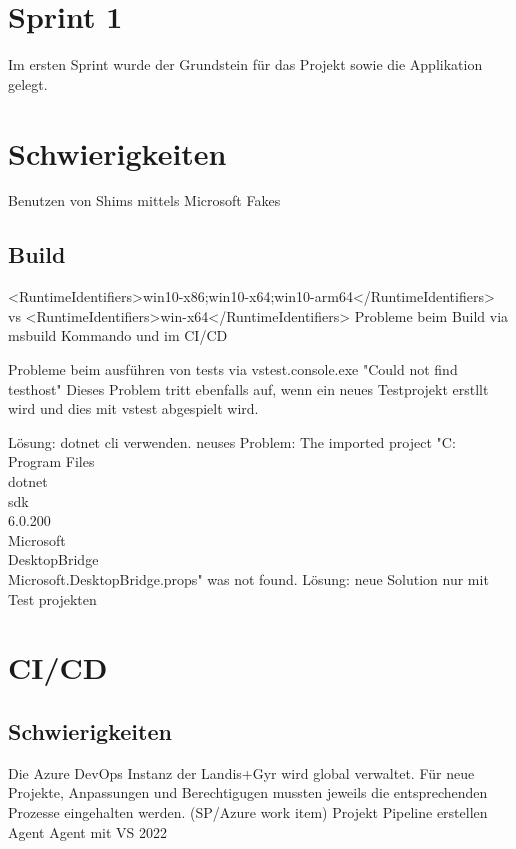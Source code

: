 \section{Sprint 1}
Im ersten Sprint wurde der Grundstein für das Projekt sowie die Applikation gelegt.


\section{Schwierigkeiten}
Benutzen von Shims mittels Microsoft Fakes

\subsection{Build}
<RuntimeIdentifiers>win10-x86;win10-x64;win10-arm64</RuntimeIdentifiers> vs <RuntimeIdentifiers>win-x64</RuntimeIdentifiers>
Probleme beim Build via msbuild Kommando und im CI/CD

Probleme beim ausführen von tests via vstest.console.exe
"Could not find testhost"
Dieses Problem tritt ebenfalls auf, wenn ein neues Testprojekt erstllt wird und dies mit vstest abgespielt wird.

Lösung:
dotnet cli verwenden. neuses Problem:  The imported project "C:\\Program Files\\dotnet\\sdk\\6.0.200\\Microsoft\\DesktopBridge\\Microsoft.DesktopBridge.props" was not found.
Lösung:
neue Solution nur mit Test projekten

\section{CI/CD}

\subsection{Schwierigkeiten}
Die Azure DevOps Instanz der Landis+Gyr wird global verwaltet. Für neue Projekte, Anpassungen und Berechtigugen mussten jeweils die entsprechenden Prozesse eingehalten werden. (SP/Azure work item)
Projekt
Pipeline erstellen
Agent
Agent mit VS 2022

